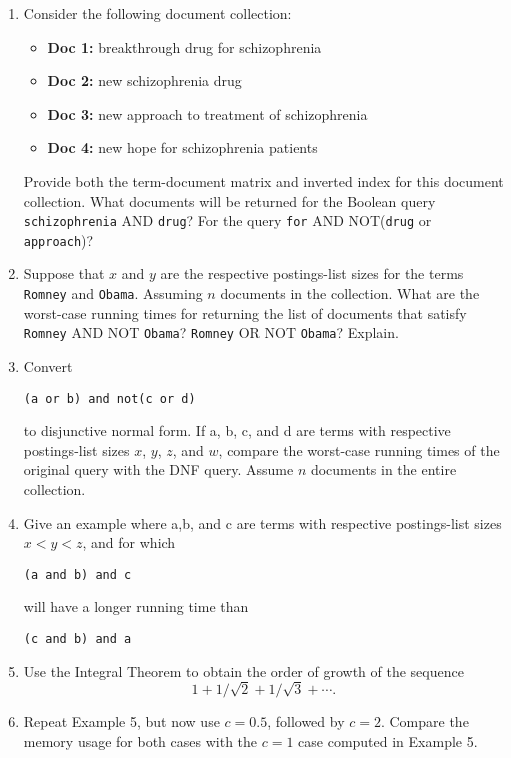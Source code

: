 \documentclass [12pt]{article}
\begin{document}
\begin{enumerate}
\item Consider the following document collection:
\begin{itemize}
\item \textbf{Doc 1:} breakthrough drug for schizophrenia
\item \textbf{Doc 2:} new schizophrenia drug
\item \textbf{Doc 3:} new approach to treatment of schizophrenia
\item \textbf{Doc 4:} new hope for schizophrenia patients
\end{itemize}
Provide both the term-document matrix and inverted index for this document collection.
What documents will be returned for the Boolean query \texttt{schizophrenia} AND
\texttt{drug}? For the query \texttt{for} AND NOT(\texttt{drug} or \texttt{approach})?

\item Suppose that $x$ and $y$ are the respective postings-list sizes for the terms
\texttt{Romney} and \texttt{Obama}. Assuming $n$ documents in the collection.
What are the worst-case running times for returning the list of documents that satisfy 
\texttt{Romney} AND NOT \texttt{Obama}? \texttt{Romney} OR NOT \texttt{Obama}? 
Explain.

\item Convert
\begin{verbatim}
(a or b) and not(c or d)
\end{verbatim} 
to disjunctive normal form. If a, b, c, and d are terms with respective postings-list sizes 
$x$, $y$, $z$, and $w$, compare the worst-case running times of the original query
with the DNF query. Assume $n$ documents in the entire collection.

\item Give an example where a,b, and c are terms with respective postings-list sizes
$x < y < z$, and for which 
\begin{verbatim}
(a and b) and c
\end{verbatim} 
will have a longer running time than
\begin{verbatim}
(c and b) and a
\end{verbatim}

\item Use the Integral Theorem to obtain the order of growth of the sequence
\[1+1/\sqrt{2}+1/\sqrt{3}+\cdots.\]

\item Repeat Example 5, but now use $c=0.5$, followed by $c=2$. Compare the memory usage
for both cases with the $c=1$ case computed in Example 5.


\end{enumerate}
\end{document}
